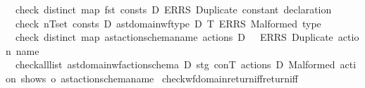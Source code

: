 \begin{isabellebody}
\ \ check\ {\isacharparenleft}{\kern0pt}distinct\ {\isacharparenleft}{\kern0pt}map\ fst\ {\isacharparenleft}{\kern0pt}consts\ D{\isacharparenright}{\kern0pt}{\isacharparenright}{\kern0pt}{\isacharparenright}{\kern0pt}\ {\isacharparenleft}{\kern0pt}ERRS\ {\isacharprime}{\kern0pt}{\isacharprime}{\kern0pt}Duplicate\ constant\ declaration{\isacharprime}{\kern0pt}{\isacharprime}{\kern0pt}{\isacharparenright}{\kern0pt}{\isacharsemicolon}{\kern0pt}\isanewline
\ \ check\ {\isacharparenleft}{\kern0pt}{\isasymforall}{\isacharparenleft}{\kern0pt}n{\isacharcomma}{\kern0pt}T{\isacharparenright}{\kern0pt}{\isasymin}set\ {\isacharparenleft}{\kern0pt}consts\ D{\isacharparenright}{\kern0pt}{\isachardot}{\kern0pt}\ ast{\isacharunderscore}{\kern0pt}domain{\isachardot}{\kern0pt}wf{\isacharunderscore}{\kern0pt}type\ D\ T{\isacharparenright}{\kern0pt}\ {\isacharparenleft}{\kern0pt}ERRS\ {\isacharprime}{\kern0pt}{\isacharprime}{\kern0pt}Malformed\ type{\isacharprime}{\kern0pt}{\isacharprime}{\kern0pt}{\isacharparenright}{\kern0pt}{\isacharsemicolon}{\kern0pt}\isanewline
\ \ check\ {\isacharparenleft}{\kern0pt}distinct\ {\isacharparenleft}{\kern0pt}map\ ast{\isacharunderscore}{\kern0pt}action{\isacharunderscore}{\kern0pt}schema{\isachardot}{\kern0pt}name\ {\isacharparenleft}{\kern0pt}actions\ D{\isacharparenright}{\kern0pt}{\isacharparenright}{\kern0pt}\ \ {\isacharparenright}{\kern0pt}\ {\isacharparenleft}{\kern0pt}ERRS\ {\isacharprime}{\kern0pt}{\isacharprime}{\kern0pt}Duplicate\ action\ name{\isacharprime}{\kern0pt}{\isacharprime}{\kern0pt}{\isacharparenright}{\kern0pt}{\isacharsemicolon}{\kern0pt}\isanewline
\ \ check{\isacharunderscore}{\kern0pt}all{\isacharunderscore}{\kern0pt}list\ {\isacharparenleft}{\kern0pt}ast{\isacharunderscore}{\kern0pt}domain{\isachardot}{\kern0pt}wf{\isacharunderscore}{\kern0pt}action{\isacharunderscore}{\kern0pt}schema{\isacharprime}{\kern0pt}\ D\ stg\ conT{\isacharparenright}{\kern0pt}\ {\isacharparenleft}{\kern0pt}actions\ D{\isacharparenright}{\kern0pt}\ {\isacharprime}{\kern0pt}{\isacharprime}{\kern0pt}Malformed\ action{\isacharprime}{\kern0pt}{\isacharprime}{\kern0pt}\ {\isacharparenleft}{\kern0pt}shows\ o\ ast{\isacharunderscore}{\kern0pt}action{\isacharunderscore}{\kern0pt}schema{\isachardot}{\kern0pt}name{\isacharparenright}{\kern0pt}\isanewline
{\isacharbraceright}{\kern0pt}{\isachardoublequoteclose}\isanewline
\isanewline
{}\isamarkupfalse%
\ check{\isacharunderscore}{\kern0pt}wf{\isacharunderscore}{\kern0pt}domain{\isacharunderscore}{\kern0pt}return{\isacharunderscore}{\kern0pt}iff{\isacharbrackleft}{\kern0pt}return{\isacharunderscore}{\kern0pt}iff{\isacharbrackright}{\kern0pt}{\isacharcolon}{\kern0pt}\isanewline

\end{isabellebody}
